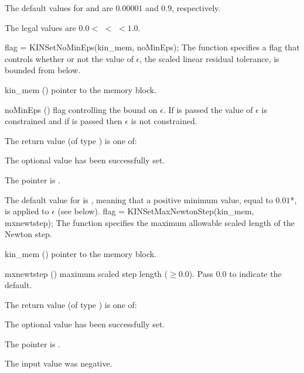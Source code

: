 {
  The default values for  and  are $0.00001$ and $0.9$,
  respectively.

  The legal values are $0.0 <$  $<$  $< 1.0$.
}
{
flag = KINSetNoMinEps(kin\_mem, noMinEps);
}
{
  The function  specifies a flag that controls whether or not
  the value of $\epsilon$, the scaled linear residual tolerance, is
  bounded from below.
}
{
  \begin{args}[noMinEps]
  \item[kin\_mem] ()
    pointer to the {\kinsol} memory block.
  \item[noMinEps] ()
    flag controlling the bound on $\epsilon$. If  is passed the
    value of $\epsilon$ is constrained and if  is passed then
    $\epsilon$ is not constrained.
  \end{args}
}
{
  The return value  (of type ) is one of:
  \begin{args}
  \item[\Id{KIN\_SUCCESS}]
    The optional value has been successfully set.
  \item[\Id{KIN\_MEM\_NULL}]
    The  pointer is .
  \end{args}
}
{
  The default value for  is , meaning that a
  positive minimum value, equal to $0.01$*, is applied to
  $\epsilon$ (see  below).
}
{
flag = KINSetMaxNewtonStep(kin\_mem, mxnewtstep);
}
{
  The function  specifies the maximum allowable scaled
  length of the Newton step.
}
{
  \begin{args}[mxnewtstep]
  \item[kin\_mem] ()
    pointer to the {\kinsol} memory block.
  \item[mxnewtstep] ()
    maximum scaled step length ($\geq 0.0$).  Pass $0.0$ to indicate the default.
  \end{args}
}
{
  The return value  (of type ) is one of:
  \begin{args}
  \item[\Id{KIN\_SUCCESS}]
    The optional value has been successfully set.
  \item[\Id{KIN\_MEM\_NULL}]
    The  pointer is .
  \item[\Id{KIN\_ILL\_INPUT}]
    The input value was negative.
  \end{args}
}
